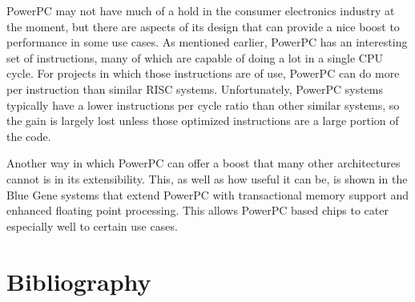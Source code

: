 \documentclass{article}
\begin{document}
PowerPC may not have much of a hold in the consumer electronics industry at the moment,
but there are aspects of its design that can provide a nice boost to performance in some
use cases. As mentioned earlier, PowerPC has an interesting set of instructions, many of which
are capable of doing a lot in a single CPU cycle. For projects in which those instructions are of use,
PowerPC can do more per instruction than similar RISC systems. Unfortunately, PowerPC systems typically
have a lower instructions per cycle ratio than other similar systems, so the gain is largely lost unless
those optimized instructions are a large portion of the code.

Another way in which PowerPC can offer a boost that many other architectures cannot is in its extensibility.
This, as well as how useful it can be, is shown in the Blue Gene systems that extend PowerPC with transactional memory
support and enhanced floating point processing. This allows PowerPC based chips to cater especially well to certain
use cases.  

\section*{Bibliography}
\printbibliography
\end{document}
